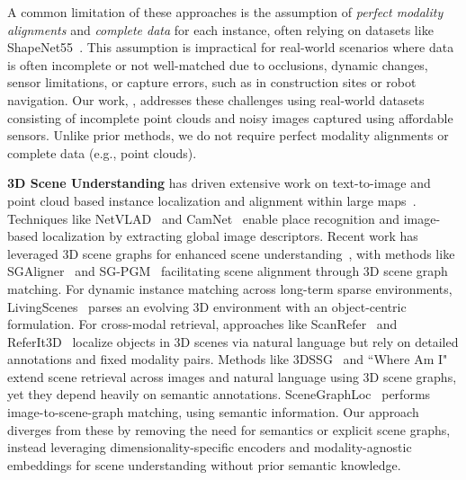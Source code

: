 A common limitation of these approaches is the assumption of \textit{perfect modality alignments} and \textit{complete data} for each instance, often relying on datasets like ShapeNet55~\cite{Chang2015ShapeNetAI}. 
This assumption is impractical for real-world scenarios where data is often incomplete or not well-matched due to occlusions, dynamic changes, sensor limitations, or capture errors, such as in construction sites or robot navigation.
Our work, \project{}, addresses these challenges using real-world datasets consisting of incomplete point clouds and noisy images captured using affordable sensors. Unlike prior methods, we do not require perfect modality alignments or complete data (e.g., point clouds).

\noindent \textbf{3D Scene Understanding} has driven extensive work on text-to-image and point cloud based instance localization and alignment within large maps~\cite{Arandjelovi2015NetVLADCA,camnet2019,text2pos2022}. Techniques like NetVLAD~\cite{Arandjelovi2015NetVLADCA} and CamNet~\cite{camnet2019} enable place recognition and image-based localization by extracting global image descriptors. Recent work has leveraged 3D scene graphs for enhanced scene understanding~\cite{armeni20193d,rosinol20203d,kim20193}, with methods like SGAligner~\cite{sarkar2023sgaligner} and SG-PGM~\cite{xie2024sg} facilitating scene alignment through 3D scene graph matching. For dynamic instance matching across long-term sparse environments, LivingScenes~\cite{zhu2023living} parses an evolving 3D environment with an object-centric formulation. For cross-modal retrieval, approaches like ScanRefer~\cite{chen2020scanrefer} and ReferIt3D~\cite{achlioptas2020referit_3d} localize objects in 3D scenes via natural language but rely on detailed annotations and fixed modality pairs. Methods like 3DSSG~\cite{3DSSG2020} and ``Where Am I"~\cite{Chen2024WhereAI} extend scene retrieval across images and natural language using 3D scene graphs, yet they depend heavily on semantic annotations. SceneGraphLoc~\cite{miao2024scenegraphloc} performs image-to-scene-graph matching, using semantic information. Our approach diverges from these by removing the need for semantics or explicit scene graphs, instead leveraging dimensionality-specific encoders and modality-agnostic embeddings for scene understanding without prior semantic knowledge. 

